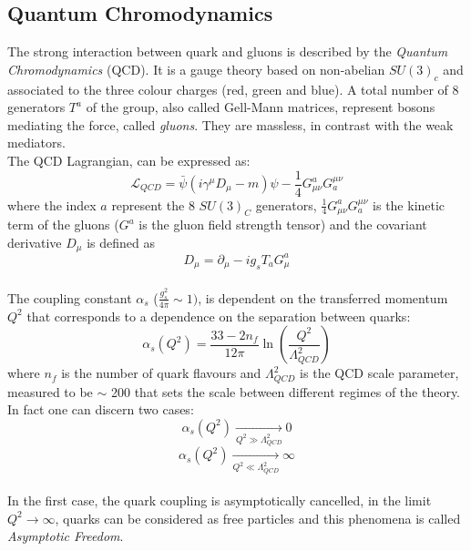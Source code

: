 \subsection{Quantum Chromodynamics} 

The strong interaction between quark and gluons is described by the \textit{Quantum Chromodynamics} (QCD). It is a gauge theory based on non-abelian 
$SU(3)_{c}$\footnotemark {}
and associated to the three colour charges (red, green and blue). A total number of 8 generators $T^a$ of the group, also called Gell-Mann matrices,
represent bosons mediating the force, called \textit{gluons}. They are massless, in contrast with the weak mediators.
\vspace{\baselineskip}
\\The QCD Lagrangian, can be expressed as:
\begin{equation}
\mathcal{L}_{QCD}  =  \bar{\psi}(i\gamma^{\mu}D_{\mu}-m)\psi-\frac{1}{4}G^{a}_{\mu\nu}G^{\mu\nu}_a
\end{equation}
where the index $a$ represent the 8 $SU(3)_C$ generators,  $\frac{1}{4}G^{a}_{\mu\nu}G^{\mu\nu}_a$ is the kinetic term of the gluons ($G^a$ is the gluon field strength tensor) and the covariant derivative $D_{\mu}$ is defined as
\begin{equation}
D_{\mu}=\partial_{\mu}-ig_{s}T_{a}G^{a}_{\mu}
\end{equation}
\vspace{\baselineskip}
\\The coupling constant $\alpha_{s}$ ($\frac{g^2_s}{4\pi}\sim 1)$, is dependent on the transferred momentum $Q^2$ that corresponds to a dependence on the separation between quarks:
\begin{equation}
\alpha_{s}(Q^2)= \frac{33-2n_f}{12\pi}   \ln\left( \frac{Q^2}{\Lambda^{2}_{QCD}}   \right)
\end{equation}
where $n_f$ is the number of quark flavours and $\Lambda^{2}_{QCD}$ is the QCD scale parameter, measured to be $\sim$ 200 \MeV that sets the scale 
between different regimes of the theory. \\
In fact one can discern two cases:
\[\alpha_{s}(Q^2)\xrightarrow[Q^{2} \gg \Lambda^{2}_{QCD} ]{}0\]
\[\alpha_{s}(Q^2)\xrightarrow[Q^{2} \ll \Lambda^{2}_{QCD} ]{}\infty\]
\\In the first case, the quark coupling is asymptotically cancelled, in the limit $Q^{2}\rightarrow \infty$, quarks can be considered as free particles and this phenomena is called \textit{Asymptotic Freedom}.
